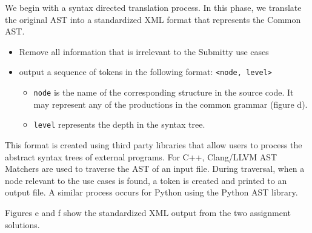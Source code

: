 \documentclass[thesis]{hmcposter}
\begin{document}
\begin{poster}
We begin with a syntax directed translation process. In this phase, we translate the original AST into a standardized XML format that represents the Common AST.
\vspace{0.5in}
\begin{itemize}
\item Remove all information that is irrelevant to the Submitty use cases 
\item output a sequence of tokens in the following format: \texttt{<node, level>}
	\begin{itemize}
	\item \texttt{node} is the name of the corresponding structure in the source code. It may represent any of the productions in the common grammar (figure d).
	\item \texttt{level} represents the depth in the syntax tree. %
	\end{itemize}
\end{itemize}
\vspace{0.5in}
%

\columnbreak

This format is created using third party libraries that allow users to process the abstract syntax trees of external programs. For C++, Clang/LLVM AST Matchers are used to traverse the AST of an input file. During traversal, when a node relevant to the use cases is found, a token is created and printed to an output file. A similar process occurs for Python using the Python AST library.

Figures e and f show the standardized XML output from the two assignment solutions.


\end{poster}
\end{document}
